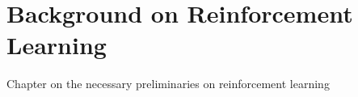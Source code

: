 \section{Background on Reinforcement Learning}

Chapter on the necessary preliminaries on reinforcement learning
